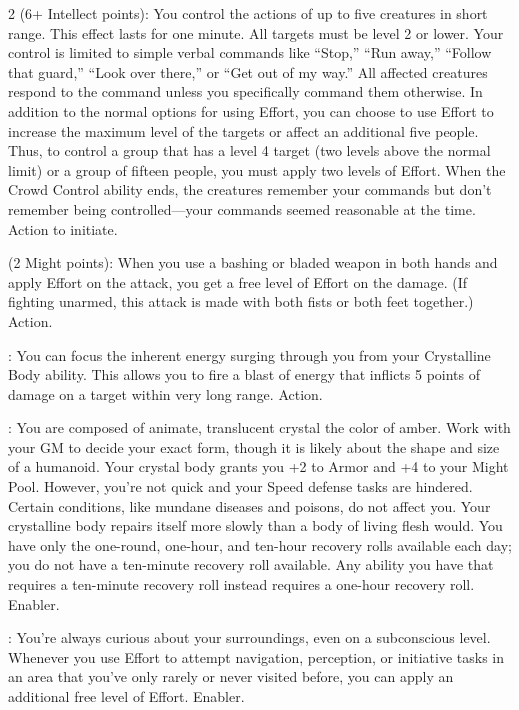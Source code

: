 \begin{multicols}{2}
 (6+ Intellect points): You control the actions of up to five creatures in short range. This effect lasts for one minute. All targets must be level 2 or lower. Your control is limited to simple verbal commands like “Stop,” “Run away,” “Follow that guard,” “Look over there,” or “Get out of my way.” All affected creatures respond to the command unless you specifically command them otherwise. In addition to the normal options for using Effort, you can choose to use Effort to increase the maximum level of the targets or affect an additional five people. Thus, to control a group that has a level 4 target (two levels above the normal limit) or a group of fifteen people, you must apply two levels of Effort. When the Crowd Control ability ends, the creatures remember your commands but don’t remember being controlled—your commands seemed reasonable at the time. Action to initiate. 

 (2 Might points): When you use a bashing or bladed weapon in both hands and apply Effort on the attack, you get a free level of Effort on the damage. (If fighting unarmed, this attack is made with both fists or both feet together.) Action. 

: You can focus the inherent energy surging through you from your Crystalline Body ability. This allows you to fire a blast of energy that inflicts 5 points of damage on a target within very long range. Action. 

: You are composed of animate, translucent crystal the color of amber. Work with your GM to decide your exact form, though it is likely about the shape and size of a humanoid. Your crystal body grants you +2 to Armor and +4 to your Might Pool. However, you’re not quick and your Speed defense tasks are hindered. Certain conditions, like mundane diseases and poisons, do not affect you. Your crystalline body repairs itself more slowly than a body of living flesh would. You have only the one-round, one-hour, and ten-hour recovery rolls available each day; you do not have a ten-minute recovery roll available. Any ability you have that requires a ten-minute recovery roll instead requires a one-hour recovery roll. Enabler. 

: You’re always curious about your surroundings, even on a subconscious level. Whenever you use Effort to attempt navigation, perception, or initiative tasks in an area that you’ve only rarely or never visited before, you can apply an additional free level of Effort. Enabler. 


\end{multicols}
